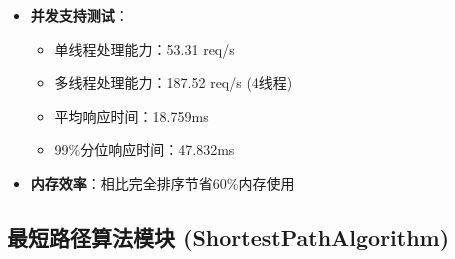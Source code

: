 \documentclass[12pt,a4paper]{article}
\begin{document}
\begin{itemize}
    \begin{tcolorbox}[
        colback=light,
        colframe=dark,
        title={\textbf{智能阈值自适应算法}},
        coltitle=white,
        colbacktitle=dark,
        fonttitle=\bfseries,
        rounded corners=3pt
    ]
    \begin{lstlisting}[language=Python, caption={Top-K推荐自适应策略实现}]
threshold = max(100, k * 8)
if len(data) <= threshold or k >= len(data) * 0.5:
    return sorted(data, key=key_func, reverse=reverse)[:k]
else:
    return quickselect_top_k(data, key_func, k, reverse)
    \end{lstlisting}
    \end{tcolorbox}
    \item \textbf{并发支持测试}：
    \begin{itemize}
        \item 单线程处理能力：53.31 req/s
        \item 多线程处理能力：187.52 req/s (4线程)
        \item 平均响应时间：18.759ms
        \item 99\%分位响应时间：47.832ms
    \end{itemize}
    \item \textbf{内存效率}：相比完全排序节省60\%内存使用
\end{itemize}

\subsection{最短路径算法模块 (ShortestPathAlgorithm)}
\end{document}
